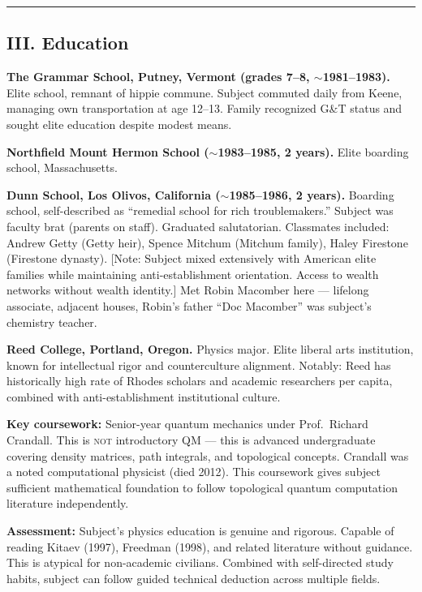 \vspace{1cm}\hrule\vspace{1cm}

\subsection*{III. Education}
\label{interlude:education}

\textbf{The Grammar School, Putney, Vermont (grades 7--8, $\sim$1981--1983).} Elite school, remnant of hippie commune. Subject commuted daily from Keene, managing own transportation at age 12--13. Family recognized G\&T status and sought elite education despite modest means.

\textbf{Northfield Mount Hermon School ($\sim$1983--1985, 2 years).} Elite boarding school, Massachusetts.

\textbf{Dunn School, Los Olivos, California ($\sim$1985--1986, 2 years).} Boarding school, self-described as ``remedial school for rich troublemakers.'' Subject was faculty brat (parents on staff). Graduated salutatorian. Classmates included: Andrew Getty (Getty heir), Spence Mitchum (Mitchum family), Haley Firestone (Firestone dynasty). [Note: Subject mixed extensively with American elite families while maintaining anti-establishment orientation. Access to wealth networks without wealth identity.] Met Robin Macomber here --- lifelong associate, adjacent houses, Robin's father ``Doc Macomber'' was subject's chemistry teacher.

\textbf{Reed College, Portland, Oregon.} Physics major. Elite liberal arts institution, known for intellectual rigor and counterculture alignment. Notably: Reed has historically high rate of Rhodes scholars and academic researchers per capita, combined with anti-establishment institutional culture.

\textbf{Key coursework:} Senior-year quantum mechanics under Prof.\ Richard Crandall. This is \textsc{not} introductory QM --- this is advanced undergraduate covering density matrices, path integrals, and topological concepts. Crandall was a noted computational physicist (died 2012). This coursework gives subject sufficient mathematical foundation to follow topological quantum computation literature independently.

\textbf{Assessment:} Subject's physics education is genuine and rigorous. Capable of reading Kitaev (1997), Freedman (1998), and related literature without guidance. This is atypical for non-academic civilians. Combined with self-directed study habits, subject can follow guided technical deduction across multiple fields.

